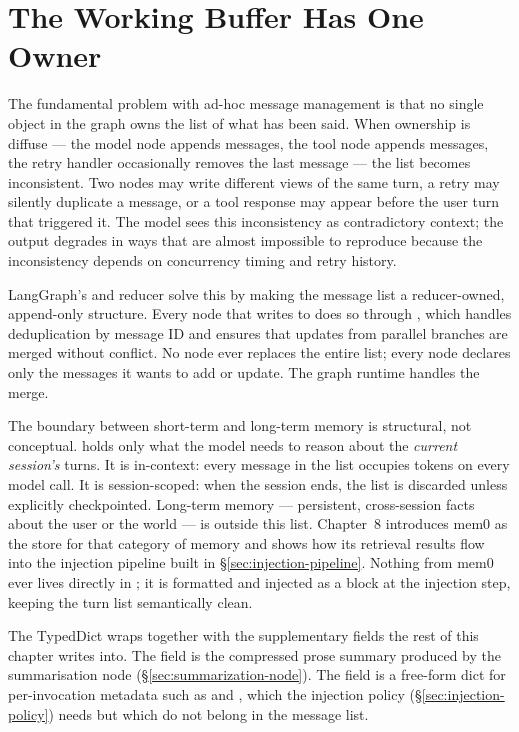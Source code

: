 \section{The Working Buffer Has One Owner}
\label{sec:messages-state}

The fundamental problem with ad-hoc message management is that no
single object in the graph owns the list of what has been said. When
ownership is diffuse --- the model node appends messages, the tool node
appends messages, the retry handler occasionally removes the last
message --- the list becomes inconsistent. Two nodes may write
different views of the same turn, a retry may silently duplicate a
message, or a tool response may appear before the user turn that
triggered it. The model sees this inconsistency as contradictory
context; the output degrades in ways that are almost impossible to
reproduce because the inconsistency depends on concurrency timing and
retry history.

LangGraph's  and  reducer solve
this by making the message list a reducer-owned, append-only structure.
Every node that writes to  does so through
, which handles deduplication by message ID and
ensures that updates from parallel branches are merged without
conflict. No node ever replaces the entire list; every node declares
only the messages it wants to add or update. The graph runtime handles
the merge.

The boundary between short-term and long-term memory is structural, not
conceptual.  holds only what the model needs to
reason about the \emph{current session's} turns. It is in-context: every
message in the list occupies tokens on every model call. It is
session-scoped: when the session ends, the list is discarded unless
explicitly checkpointed. Long-term memory --- persistent, cross-session
facts about the user or the world --- is outside this list. Chapter~8
introduces mem0 as the store for that category of memory and shows how
its retrieval results flow into the injection pipeline built in
\S\ref{sec:injection-pipeline}. Nothing from mem0 ever lives directly
in ; it is formatted and injected as a
 block at the injection step, keeping the turn list
semantically clean.

The  TypedDict wraps  together with
the supplementary fields the rest of this chapter writes into. The
 field is the compressed prose summary produced by the
summarisation node (\S\ref{sec:summarization-node}). The 
field is a free-form dict for per-invocation metadata such as
 and , which the injection policy
(\S\ref{sec:injection-policy}) needs but which do not belong in the
message list.

